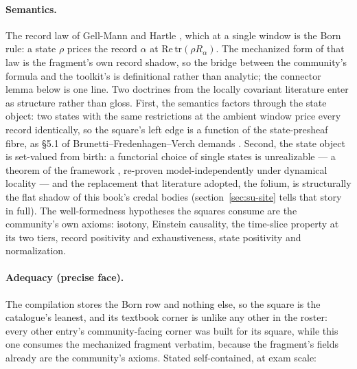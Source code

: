 \paragraph{Semantics.} The record law of Gell-Mann and Hartle
\cite{gellmann92}, which at a single window is the Born rule: a
state $\rho$ prices the record $\alpha$ at
$\mathrm{Re}\,\mathrm{tr}(\rho R_\alpha)$. The mechanized form of
that law is the fragment's own record shadow, so the bridge between
the community's formula and the toolkit's is definitional rather
than analytic; the connector lemma below is one line. Two doctrines
from the locally covariant literature enter as structure rather than
gloss. First, the semantics factors through the state object: two
states with the same restrictions at the ambient window price every
record identically, so the square's left edge is a function of the
state-presheaf fibre, as \S5.1 of Brunetti--Fredenhagen--Verch
demands \cite{brunetti01}. Second, the state object is set-valued
from birth: a functorial choice of single states is unrealizable ---
a theorem of the framework \cite{brunetti01}, re-proven
model-independently under dynamical locality \cite{fewster11} ---
and the replacement that literature adopted, the folium, is
structurally the flat shadow of this book's credal bodies
(section~\ref{sec:su-site} tells that story in full). The
well-formedness hypotheses the squares consume are the community's
own axioms: isotony, Einstein causality, the time-slice property at
its two tiers, record positivity and exhaustiveness, state
positivity and normalization.

\paragraph{Adequacy (precise face).} The compilation stores the Born
row and nothing else, so the square is the catalogue's leanest, and
its textbook corner is unlike any other in the roster: every other
entry's community-facing corner was built for its square, while this
one consumes the mechanized fragment verbatim, because the
fragment's fields already are the community's axioms. Stated
self-contained, at exam scale:

